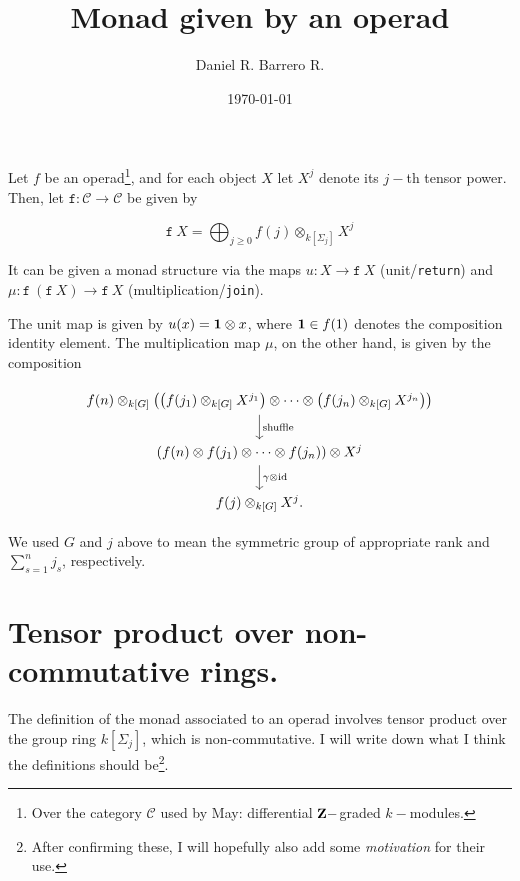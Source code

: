 \documentclass{amsart}
\title{Monad given by an operad}
\author{Daniel R. Barrero R.}
\date{\today}
\begin{document}
\maketitle

\section{}

Let $f$ be an operad\footnote{Over the category $\mathcal{C}$ used by May: differential
$\mathbf{Z}-$graded $k-$modules.}, and for each object $X$ let $X^j$ denote its $j-$th tensor
power. Then, let $\mathtt{f} : \mathcal{C} \to \mathcal{C}$ be given by

$$
\mathtt{f}\ X = \bigoplus_{j \geq 0} f(j) \otimes_{k[\Sigma_j]} X^j
$$

It can be given a monad structure via the maps $u : X \to \mathtt{f}\ X$ (unit/\texttt{return})
and $\mu : \mathtt{f} \ (\mathtt{f} \ X) \to \mathtt{f} \ X$ (multiplication/\texttt{join}).

\bigskip

\noindent The unit map is given by $u(x) = \mathbf{1} \otimes x$, where $\mathbf{1} \in f(1)$ denotes the
composition identity element. The multiplication map $\mu$, on the other hand, is given by the
composition

\begin{displaymath}
	\begin{tikzcd}
		f(n) \otimes_{k[G]}
		\left( 
			\left( 
				f(j_1) \otimes_{k[G]} X^{j_1}
			\right) \otimes \cdots \otimes
			\left( 
				f(j_n) \otimes_{k[G]} X^{j_n}
			\right)
		\right) \arrow[d, "\text{shuffle}"] \\
		\left( 
			f(n) \otimes f(j_1) \otimes \cdots \otimes f(j_n)
		\right) \otimes X^j \arrow[d, "\gamma \otimes \mathrm{id}"] \\
		f(j) \otimes_{k[G]} X^j.
	\end{tikzcd}
\end{displaymath}

We used $G$ and $j$ above to mean the symmetric group of appropriate rank and $\sum_{s=1}^{n} j_s$,
respectively.

\section{Tensor product over non-commutative rings.}
The definition of the monad associated to an operad involves tensor product over the group ring
$k[\Sigma_j]$, which is non-commutative.  I will write down what I think the definitions should
be\footnote{After confirming these, I will hopefully also add some \emph{motivation} for their
use.}.
\end{document}
